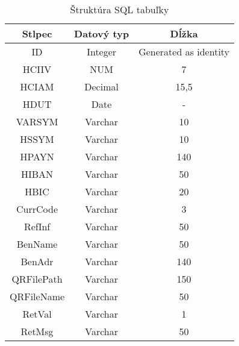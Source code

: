 \begin{table}[!ht]
\caption{Štruktúra \acs{SQL} tabuľky}
\label{tab:table_struct}
\begin{center}
    \begin{tabular}{|c|c|c|}
    \hline
    \textbf{Stlpec} & \textbf{Datový typ} & \textbf{Dĺžka}        \\ \hline
    ID              & Integer             & Generated as identity \\ \hline
    HCIIV           & NUM                 & 7                     \\ \hline
    HCIAM           & Decimal             & 15,5                  \\ \hline
    HDUT            & Date                & -                     \\ \hline
    VARSYM          & Varchar             & 10                    \\ \hline
    HSSYM           & Varchar             & 10                    \\ \hline
    HPAYN           & Varchar             & 140                   \\ \hline
    HIBAN           & Varchar             & 50                    \\ \hline
    HBIC            & Varchar             & 20                    \\ \hline
    CurrCode        & Varchar             & 3                     \\ \hline
    RefInf          & Varchar             & 50                    \\ \hline
    BenName         & Varchar             & 50                    \\ \hline
    BenAdr          & Varchar             & 140                   \\ \hline
    QRFilePath      & Varchar             & 150                   \\ \hline
    QRFileName      & Varchar             & 50                    \\ \hline
    RetVal          & Varchar             & 1                     \\ \hline
    RetMsg          & Varchar             & 50                    \\ \hline
    \end{tabular}
\end{center}    
\end{table}
